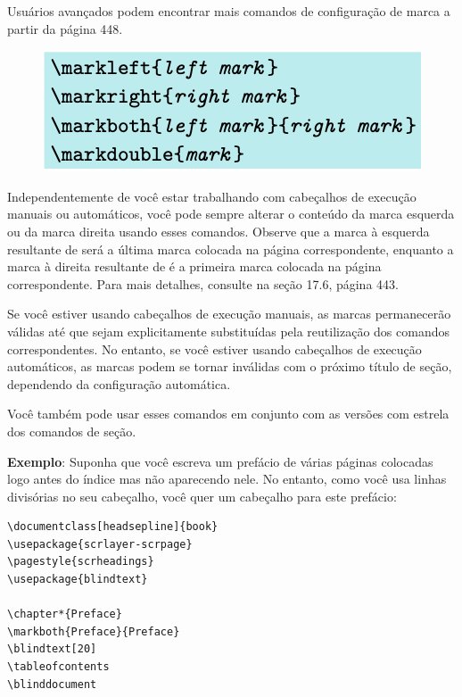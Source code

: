 Usuários avançados podem encontrar mais comandos de configuração de marca a partir da página 448.

\begin{figure}[h]
    \centering
    \includegraphics[width=0.5\linewidth]{imagens/imagem09.png}
\end{figure}

Independentemente de você estar trabalhando com cabeçalhos de execução manuais ou automáticos, você pode sempre alterar o conteúdo da marca esquerda ou da marca direita usando esses comandos. Observe que a marca à esquerda resultante de  será a última marca colocada na página correspondente, enquanto a marca à direita resultante de  é a primeira marca colocada na página correspondente. Para mais detalhes, consulte  na seção 17.6, página 443.

Se você estiver usando cabeçalhos de execução manuais, as marcas permanecerão válidas até que sejam explicitamente substituídas pela reutilização dos comandos correspondentes. No entanto, se você estiver usando cabeçalhos de execução automáticos, as marcas podem se tornar inválidas com o próximo título de seção, dependendo da configuração automática.

Você também pode usar esses comandos em conjunto com as versões com estrela dos comandos de seção.

\textbf{Exemplo}: Suponha que você escreva um prefácio de várias páginas colocadas logo antes do índice mas não aparecendo nele. No entanto, como você usa linhas divisórias no seu cabeçalho, você quer um cabeçalho para este prefácio:
\begin{verbatim}
\documentclass[headsepline]{book}
\usepackage{scrlayer-scrpage}
\pagestyle{scrheadings}
\usepackage{blindtext}

\chapter*{Preface}
\markboth{Preface}{Preface}
\blindtext[20]
\tableofcontents
\blinddocument
    
\end{verbatim}

